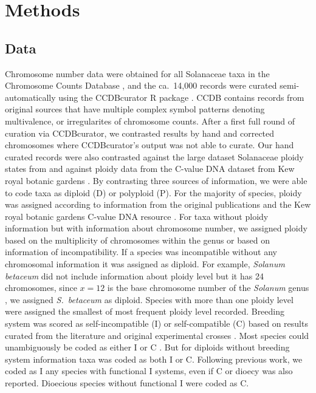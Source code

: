 \section{Methods}

\subsection{Data}


Chromosome number data were obtained for all Solanaceae taxa in the Chromosome Counts Database \citep[CCDB;][]{rice_2015}, and the ca.~14,000 records were curated semi-automatically using the CCDBcurator R package \citep{rivero_2019}. CCDB contains records from original sources that have multiple complex symbol patterns denoting multivalence, or irregularites of chromosome counts. After a first full round of curation via CCDBcurator, we contrasted results by hand and corrected chromosomes where CCDBcurator's output was not able to curate.  Our hand curated records were also contrasted against the large dataset Solanaceae ploidy states from \citet{robertson_2011} and against ploidy data from the C-value DNA dataset from Kew royal botanic gardens \citep{bennett_2005}.
By contrasting three sources of information, we were able to code taxa as diploid (D) or polyploid (P).
For the majority of species, ploidy was assigned according to information from the original publications and the Kew royal botanic gardens C-value DNA resource \citep{bennett_2005}.
For taxa without ploidy information but with information about chromosome number, we assigned ploidy based on the multiplicity of chromosomes within the genus or based on information of incompatibility. If a species was incompatible without any chromosomal information it was assigned as diploid.
For example, \textit{Solanum betaceum} did not include information about ploidy level but it has 24 chromosomes, since $x=12$ is the base chromosome number of the \textit{Solanum} genus \citep{olmstead_2007}, we assigned \textit{S.~betaceum} as diploid. 
Species with more than one ploidy level were assigned the smallest of most frequent ploidy level recorded.
%
Breeding system was scored as self-incompatible (I) or self-compatible (C) based on results curated from the literature and  original experimental crosses \citep[as compiled in][]{igic_2006, goldberg_2010, robertson_2011, goldberg_2012}.
Most species could unambiguously be coded as either I or C \citep{raduski_2012}.  But for diploids without breeding system information taxa was coded as both I or C.%
Following previous work, we coded as I any species with functional I systems, even if C or dioecy was also reported.
Dioecious species without functional I were coded as C.

